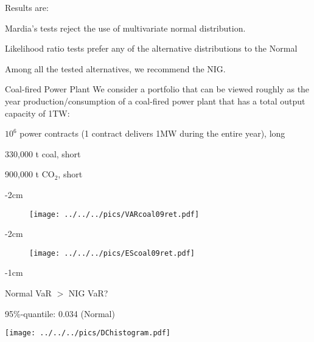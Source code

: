Results are: %
\item Mardia's tests reject the use of multivariate normal distribution.\\[-1.3cm]
\item Likelihood ratio tests prefer any of the alternative distributions to the Normal\\[-1.3cm]
\item Among all the tested alternatives, we recommend the NIG.

{Coal-fired Power Plant} We consider a portfolio
that can be viewed roughly as the year production/consumption of a
coal-fired power plant that has a total output capacity of 1TW:
\item $10^6$ power contracts (1 contract delivers 1MW during the entire year), long \\[-1.5cm]
\item 330,000 t coal, short\\[-1.5cm]
\item 900,000 t CO$_2$, short

{-2cm}
\begin{figure}
\begin{center}
\texttt{[image: ../../../pics/VARcoal09ret.pdf]}
\end{center}
\end{figure}

{-2cm}
\begin{figure}
\begin{center}
\texttt{[image: ../../../pics/EScoal09ret.pdf]}
\end{center}
\end{figure}

{-1cm}
\begin{center}
Normal VaR $>$ NIG VaR?
\end{center}
95\%-quantile: \hspace{2cm} 0.034 (Normal) \hspace{1cm}\\
\begin{center}
\texttt{[image: ../../../pics/DChistogram.pdf]}
\end{center}

